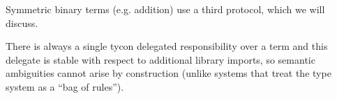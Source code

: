 \documentclass[9pt]{sigplanconf}
\begin{document}
Symmetric binary terms (e.g. addition) use a third protocol, which we will discuss. 

There is always a single tycon delegated  responsibility over a term and this delegate is stable with respect to additional library imports, so semantic ambiguities cannot arise by construction (unlike systems that treat the type system as a ``bag of rules''). %

\end{document}
